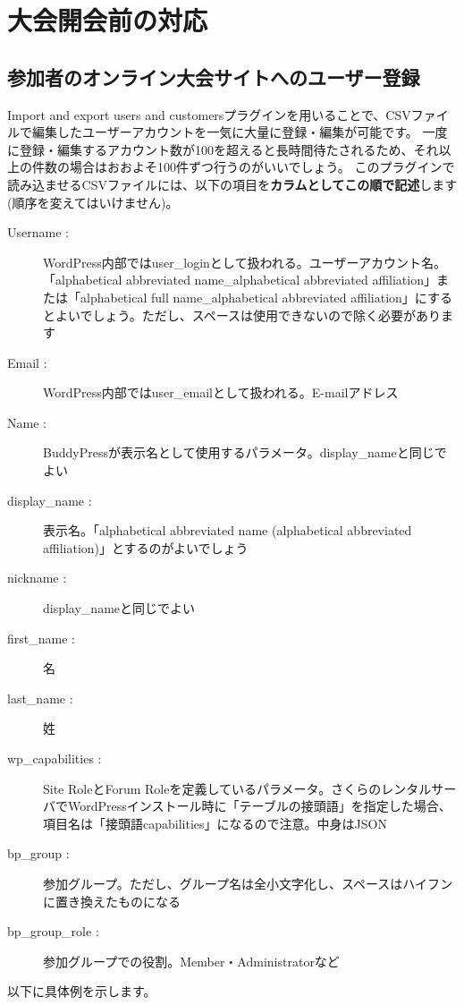 \documentclass[titlepage,10pt,a4paper,uplatex]{jsbook}
\renewcommand{\textbf}[1]{{\bfseries\sffamily#1}}
\begin{document}
\section{大会開会前の対応}

\subsection{参加者のオンライン大会サイトへのユーザー登録}

Import and export users and customersプラグインを用いることで、CSVファイルで編集したユーザーアカウントを一気に大量に登録・編集が可能です。
一度に登録・編集するアカウント数が100を超えると長時間待たされるため、それ以上の件数の場合はおおよそ100件ずつ行うのがいいでしょう。
このプラグインで読み込ませるCSVファイルには、以下の項目を\textbf{カラムとしてこの順で記述}します(順序を変えてはいけません)。

\begin{description}
\item[Username : ] WordPress内部ではuser\_loginとして扱われる。ユーザーアカウント名。「alphabetical abbreviated name\_alphabetical abbreviated affiliation」または「alphabetical full name\_alphabetical abbreviated affiliation」にするとよいでしょう。ただし、スペースは使用できないので除く必要があります
\item[Email : ] WordPress内部ではuser\_emailとして扱われる。E-mailアドレス
\item[Name : ] BuddyPressが表示名として使用するパラメータ。display\_nameと同じでよい
\item[display\_name : ] 表示名。「alphabetical abbreviated name (alphabetical abbreviated affiliation)」とするのがよいでしょう
\item[nickname : ] display\_nameと同じでよい
\item[first\_name : ] 名
\item[last\_name : ] 姓
\item[wp\_capabilities : ] Site RoleとForum Roleを定義しているパラメータ。さくらのレンタルサーバでWordPressインストール時に「テーブルの接頭語」を指定した場合、項目名は「接頭語capabilities」になるので注意。中身はJSON
\item[bp\_group : ] 参加グループ。ただし、グループ名は全小文字化し、スペースはハイフンに置き換えたものになる
\item[bp\_group\_role : ] 参加グループでの役割。Member・Administratorなど
\end{description}

以下に具体例を示します。
\end{document}

